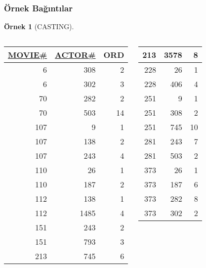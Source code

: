 \documentclass[dvipsnames]{beamer}
\theoremstyle{definition}
\theoremstyle{example}
\newtheorem{ornek}[theorem]{Örnek}
\theoremstyle{plain}
\begin{document}
\begin{frame}
  \frametitle{Örnek Bağıntılar}

  \begin{ornek}[CASTING]
    \begin{columns}[b]
      \begin{tiny}
      \begin{table}
        \begin{tabular}{|r|r|r|}\hline
\underline{MOVIE\#} & \underline{ACTOR\#} & ORD\\[2pt]\hline\hline
      6 &     308 &   2\\\hline
      6 &     302 &   3\\\hline
     70 &     282 &   2\\\hline
     70 &     503 &  14\\\hline
    107 &       9 &   1\\\hline
    107 &     138 &   2\\\hline
    107 &     243 &   4\\\hline
    110 &      26 &   1\\\hline
    110 &     187 &   2\\\hline
    112 &     138 &   1\\\hline
    112 &    1485 &   4\\\hline
    151 &     243 &   2\\\hline
    151 &     793 &   3\\\hline
    213 &     745 &   6\\\hline
        \end{tabular}
      \end{table}
      \end{tiny}

      \begin{tiny}
      \begin{table}
        \begin{tabular}{|r|r|r|}\hline
    213 &    3578 &   8\\\hline
    228 &      26 &   1\\\hline
    228 &     406 &   4\\\hline
    251 &       9 &   1\\\hline
    251 &     308 &   2\\\hline
    251 &     745 &  10\\\hline
    281 &     243 &   7\\\hline
    281 &     503 &   2\\\hline
    373 &      26 &   1\\\hline
    373 &     187 &   6\\\hline
    373 &     282 &   8\\\hline
    373 &     302 &   2\\\hline
        \end{tabular}
      \end{table}
      \end{tiny}


\end{columns}
\end{ornek}
\end{frame}
\end{document}
